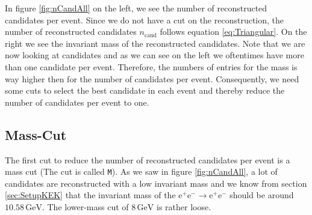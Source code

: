 \documentclass[a4paper,11pt,twosided,final,german,openbib,pdftex,listof=totoc,bibliography=totoc]{scrbook}
\begin{document}
In figure \ref{fig:nCandAll} on the left, we see the number of reconstructed candidates per event. Since we do not have a cut on the reconstruction, the number of reconstructed candidates $n_{\textrm{cand}}$ follows equation \ref{eq:Triangular}. On the right we see the invariant mass of the reconstructed candidates. Note that we are now looking at candidates and as we can see on the left we oftentimes have more than one candidate per event. Therefore, the numbers of entries for the mass is way higher then for the number of candidates per event.
Consequently, we need some cuts to select the best candidate in each event and thereby reduce the number of candidates per event to one.


\subsection{Mass-Cut}

The first cut to reduce the number of reconstructed candidates per event is a mass cut (The cut is called \texttt{M}). As we saw in figure \ref{fig:nCandAll}, a lot of candidates are reconstructed with a low invariant mass and we know from section \ref{sec:SetupKEK} that the invariant mass of the $\textrm{e}^+\textrm{e}^- \rightarrow \textrm{e}^+\textrm{e}^-$ should be around $10.58\,\textrm{GeV}$. The lower-mass cut of $8\,\textrm{GeV}$ is rather loose. 
\end{document}
